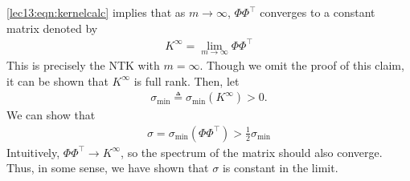 \begin{enumerate}
    \eqref{lec13:eqn:kernelcalc} implies that as $m \to \infty$, $\Phi \Phi^\top$ converges to a constant matrix denoted by 
    \begin{align}
        K^\infty = \lim_{m \to \infty} \Phi\Phi^\top 
    \end{align}
    This is precisely the NTK with $m=\infty$.  Though we omit the proof of this claim, it can be shown that $K^\infty$ is full rank. Then, let \begin{align}
        \sigma_{\min} \triangleq \sigma_{\min} (K^\infty) > 0.
    \end{align}
    We can show that 
    \begin{align}
        \sigma = \sigma_{\min} \left( \Phi \Phi^\top \right) > \frac{1}{2}\sigma_{\min} 
    \end{align} 
    Intuitively, $\Phi \Phi^\top \to K^\infty$, so the spectrum of the matrix should also converge. Thus, in some sense, we have shown that $\sigma$ is constant in the limit. 
    

\end{enumerate}
